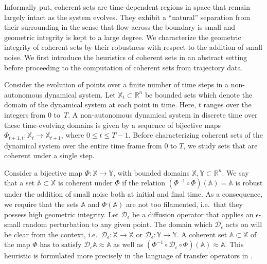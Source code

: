 Informally put, coherent sets are time-dependent regions in space that remain largely intact as the system evolves. They exhibit a \enquote{natural} separation from their surrounding %
in the sense that flow across the boundary is small and geometric integrity is kept to a large degree. We characterize the geometric integrity of coherent sets by their robustness with respect to the addition of small noise. We first introduce the heuristics of coherent sets in an abstract setting before proceeding to the computation of coherent sets from trajectory data.

Consider the evolution of points over a finite number of time steps in a non-autonomous dynamical system. Let $\mathbb{X}_t \subset \mathbb{R}^n$ be bounded sets which denote the domain of the dynamical system at each point in time. Here, $t$ ranges over the integers from $0$ to~$T$. A non-autonomous dynamical system in discrete time over these time-evolving domains is given by a sequence of bijective maps $\Phi_{t+1, t}: \mathbb{X}_t \to \mathbb{X}_{t+1}$, where $0 \leq t \leq T-1$. Before characterizing coherent sets of the dynamical system over the entire time frame from $0$ to $T$, we study sets that are coherent under a single step. %

Consider a bijective map $\Phi:\mathbb{X} \rightarrow \mathbb{Y}$, with bounded domains $\mathbb{X}, \mathbb{Y} \subset \mathbb{R}^n$. We say that a set $\mathbb{A}\subset \mathbb{X}$ is coherent under $\Phi$ if the relation $(\Phi^{-1}\circ\Phi)(\mathbb{A}) = \mathbb{A}$ is robust under the addition of small noise both at initial and final time. As a consequence, we require that the sets $\mathbb{A}$ and $\Phi (\mathbb{A})$ are not too filamented, i.e.~that they possess high geometric integrity.
Let $ \mathcal{D}_\epsilon$ be a diffusion operator that applies an $\epsilon$-small random perturbation to any given point. The domain which $\mathcal{D}_\epsilon$ acts on will be clear from the context, i.e.~$\mathcal{D}_\epsilon: \mathbb{X} \to \mathbb{X}$ or $\mathcal{D}_\epsilon: \mathbb{Y} \to \mathbb{Y}$. A coherent set $\mathbb{A} \subset \mathbb{X}$ of the map $\Phi$ has to satisfy $\mathcal{D}_\epsilon \mathbb{A} \approx \mathbb{A}$ as well as $(\Phi^{-1} \circ \mathcal{D}_{\epsilon}\circ \Phi) (\mathbb{A}) \approx \mathbb{A}$. This heuristic is formulated more precisely in the language of transfer operators in \textcite{banischUnderstandingGeometryTransport2017}.

